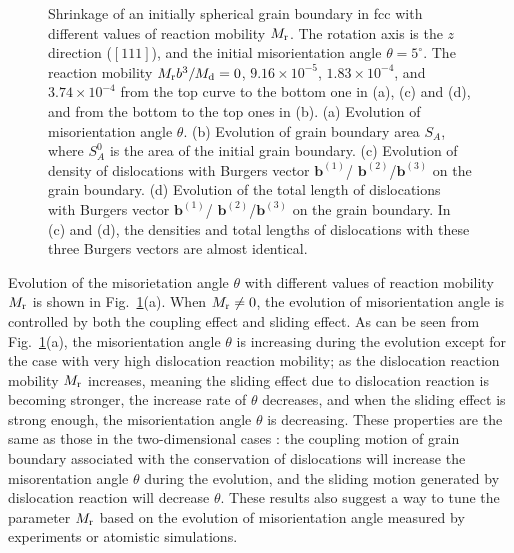 \begin{figure}[htbp]
	\centering
	\caption{Shrinkage of an initially spherical grain boundary in fcc with different values of reaction mobility $M_{\rm r}$. The rotation axis is the $z$ direction ($[111]$), and the initial misorientation angle $\theta=5^\circ$.   The reaction mobility $M_{\rm r}b^3/M_{\rm d}=0$, $9.16\times10^{-5}$, $1.83\times10^{-4}$, and $3.74\times10^{-4}$ from the top curve to the bottom one in (a), (c) and (d), and from the bottom to the top ones in (b).
(a) Evolution of  misorientation angle $\theta$. (b) Evolution of grain boundary area $S_A$, where $S_A^0$ is the area of the initial grain boundary. (c) Evolution of density of dislocations with Burgers vector $\mathbf b^{(1)}$/ $\mathbf b^{(2)}$/$\mathbf b^{(3)}$ on the grain boundary. (d) Evolution of the total length of dislocations with Burgers vector $\mathbf b^{(1)}$/ $\mathbf b^{(2)}$/$\mathbf b^{(3)}$ on the grain boundary. In (c) and (d), the densities and total lengths of dislocations with these three Burgers vectors are almost identical.  }\label{fig:fcctheta}
\end{figure}


Evolution of the misorietation angle $\theta$ with different values of reaction mobility $M_{\rm r}$ is shown in Fig.~\ref{fig:fcctheta}(a). When $M_{\rm r}\neq 0$, the evolution of misorientation angle is controlled by both the coupling effect and sliding effect. As can be seen from  Fig.~\ref{fig:fcctheta}(a), the misorientation angle $\theta$ is increasing during the evolution except for the case with very high dislocation reaction mobility;
  as the dislocation reaction mobility $M_{\rm r}$ increases, meaning the sliding effect due to dislocation reaction is becoming stronger, the increase rate of $\theta$ decreases, and when the sliding effect is strong enough, the misorientation angle $\theta$ is decreasing.  These properties are the same as those in the two-dimensional cases \cite{zhang2018motion,zhang2019new}: the coupling motion of grain boundary associated with the conservation of dislocations will increase the misorentation angle $\theta$ during the evolution, and the sliding motion generated by dislocation reaction will decrease $\theta$.  These results also suggest a way to tune the parameter $M_{\rm r}$ based on the evolution of misorientation angle measured by experiments or atomistic simulations.

